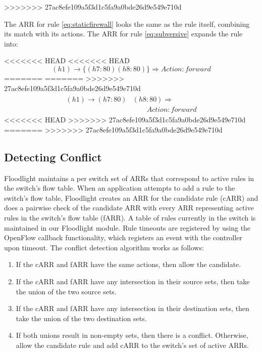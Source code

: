 >>>>>>> 27ac8efe109a5f3d1c5fa9a0bde26d9e549e710d

The ARR for rule \ref{eq:staticfirewall} looks the same as the rule itself, combining its match with its actions.
The ARR for rule \ref{eq:subversive} expands the rule into:

<<<<<<< HEAD
<<<<<<< HEAD
\begin{equation}\label{eq:arrsubversive}
(h1) \rightarrow \{(h7:80) (h8:80)\} \Rightarrow Action: forward
\end{equation}
=======
=======
>>>>>>> 27ac8efe109a5f3d1c5fa9a0bde26d9e549e710d
\begin{align}
\begin{aligned}
(h1) \rightarrow (h7:80)&(h8:80) \Rightarrow \\ 
     &\qquad Action: forward \nonumber
\end{aligned}
\end{align}
<<<<<<< HEAD
>>>>>>> 27ac8efe109a5f3d1c5fa9a0bde26d9e549e710d
=======
>>>>>>> 27ac8efe109a5f3d1c5fa9a0bde26d9e549e710d

\subsection{Detecting Conflict}
\label{subsec:conflict}
Floodlight maintains a per switch set of ARRs that correspond to active rules in the switch's flow table.
When an application attempts to add a rule to the switch's flow table, Floodlight creates an ARR for the candidate rule (cARR) and does a pairwise check of the candidate ARR with every ARR representing active rules in the switch's flow table (fARR). A table of rules currently in the switch is maintained in our Floodlight module. Rule timeouts are registered by using the OpenFlow callback functionality, which registers an event with the controller upon timeout. %
The conflict detection algorithm works as follows:
\begin{enumerate}
\item If the cARR and fARR have the same actions, then allow the candidate.
\item If the cARR and fARR have any intersection in their source sets, then take the union of the two source sets.
\item If the cARR and fARR have any intersection in their destination sets, then take the union of the two destination sets.
\item If both unions result in non-empty sets, then there is a conflict. Otherwise, allow the candidate rule and add cARR to the switch's set of active ARRs.
\end{enumerate} 

